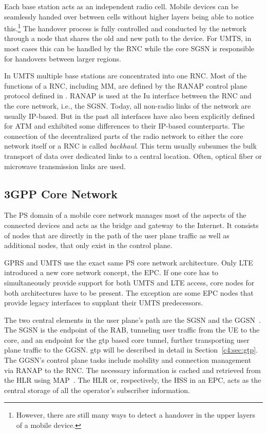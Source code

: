 Each base station acts as an independent radio cell. Mobile devices can be seamlessly handed over between cells without higher layers being able to notice this.\footnote{However, there are still many ways to detect a handover in the upper layers of a mobile device.} The handover process is fully controlled and conducted by the network through a node that shares the old and new path to the device. For \gls{UMTS}, in most cases this can be handled by the \gls{RNC} while the core \gls{SGSN} is responsible for handovers between larger regions.

In \gls{UMTS} multiple base stations are concentrated into one \gls{RNC}. Most of the functions of a \gls{RNC}, including \gls{MM}, are defined by the \gls{RANAP} control plane protocol defined in \cite{3gpp.25.413}. \gls{RANAP} is used at the Iu interface between the \gls{RNC} and the core network, i.e., the \gls{SGSN}. Today, all non-radio links of the network are usually \gls{IP}-based. But in the past all interfaces have also been explicitly defined for \gls{ATM} and exhibited some differences to their \gls{IP}-based counterparts. The connection of the decentralized parts of the radio network to either the core network itself or a \gls{RNC} is called \textit{backhaul}. This term usually subsumes the bulk transport of data over dedicated links to a central location. Often, optical fiber or microwave transmission links are used.


\subsection{\texorpdfstring{\acrshort{3GPP}}{3GPP} Core Network}

The \gls{PS} domain of a mobile core network manages most of the aspects of the connected devices and acts as the bridge and gateway to the Internet. It consists of nodes that are directly in the path of the user plane traffic as well as additional nodes, that only exist in the control plane.

\gls{GPRS} and \gls{UMTS} use the exact same \gls{PS} core network architecture. Only \gls{LTE} introduced a new core network concept, the \gls{EPC}. If one core has to simultaneously provide support for both \gls{UMTS} and \gls{LTE} access, core nodes for both architectures have to be present. The exception are some \gls{EPC} nodes that provide legacy interfaces to supplant their \gls{UMTS} predecessors.

The two central elements in the user plane's path are the \gls{SGSN} and the \gls{GGSN}~\cite{3gpp.22.060,3gpp.23.060}. The \gls{SGSN} is the endpoint of the \gls{RAB}, tunneling user traffic from the \gls{UE} to the core, and an endpoint for the \gls{gtp} based core tunnel, further transporting user plane traffic to the \gls{GGSN}. \Gls{gtp} will be described in detail in Section~\ref{c4:sec:gtp}. The \gls{GGSN}'s control plane tasks include mobility and connection management via \gls{RANAP} to the \gls{RNC}. The necessary information is cached and retrieved from the \gls{HLR} using \gls{MAP}~\cite{3gpp.29.002}. The \gls{HLR} or, respectively, the \gls{HSS} in an \gls{EPC}, acts as the central storage of all the operator's subscriber information.

